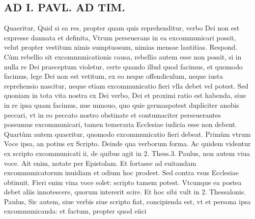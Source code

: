 \documentclass{article}
\begin{document}
\begin{pages}
\section*{AD I. PAVL. AD TIM. }
\marginpar{[ p.J8. ]}\pstart Quaeritur, Quid si ea res, propter quam quis reprehenditur, verbo Dei non est expresse dannata et definita, Vtrum perseuerans in ea excommunicari possit, velut propter vestitum nimis sumptuosum, nimias mensae lautitias. Respond. Cùm rebellio sit excommunicationis causa, rebellio autem esse non possit, si in nulla re Dei praeceptum violetur, certe quando illud quod facimus, et quomodo facimus, lege Dei non est vetitum, ex eo neque offendiculum, neque iusta reprehensio nascitur, neque etiam excommunicatio fieri vlla debet vel potest. Sed quoniam in tota vita nostra ex Dei verbo, Dei et proximi ratio est habenda, siue in re ipsa quam facimus, nue mmouo, quo quie germaspotest dupliciter anobis peccari, vt in eo peccato nostro obstinate et contumaciter perseuerantes possumus excommunicari, tamen temeraria Ecclesiae iudicia esse non debent.  \pend\pstart Quartùm autem quaeritur, quomodo excommunicatio fieri debeat. Primùm vtrum Voce ipsa, an potius ex Scripto. Deinde qua verborum forma. Ac quidem videntur ex scripto excommunicati ii, de quibus agit in 2. Thess.3. Paulus, non autem viua voce. Ait enim, notate per Epistolam. Et fortasse ad euitandam excommunicatorum inuidiam et odium hoc prodest. Sed contra vsus Ecclesiae obtinuit. Fieri enim vina voce solet: scripto tamem potest. Vtcunque ea postea debet aliis innotescere, quorum intererit scire. Et hoc sibi vult in 2. Thessalonis. Paulus, Sic autem, siue verbis siue scripto fiat, concipienda est, vt et persona ipsa excommunicanda: et factum, propter quod eiici\pend

\end{pages}
\end{document}
